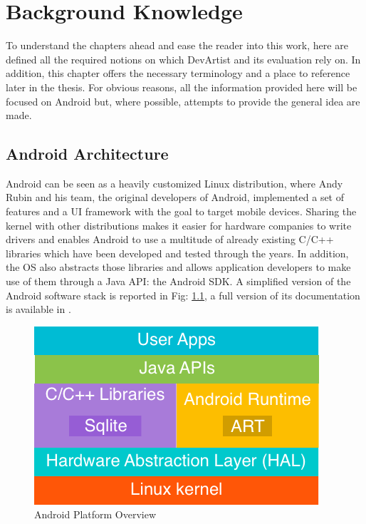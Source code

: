 \chapter{Background Knowledge}
\label{ch:background}
To understand the chapters ahead and ease the reader into this work, here are defined all the required notions on which DevArtist and its evaluation rely on. In addition, this chapter offers the necessary terminology and a place to reference later in the thesis. For obvious reasons, all the information provided here will be focused on Android but, where possible, attempts to provide the general idea are made.

\section{Android Architecture}
Android can be seen as a heavily customized Linux distribution, where Andy Rubin and his team, the original developers of Android, implemented a set of features and a UI framework with the goal to target mobile devices. Sharing the kernel with other distributions makes it easier for hardware companies to write drivers and enables Android to use a multitude of already existing C/C++ libraries which have been developed and tested through the years. In addition, the OS also abstracts those libraries and allows application developers to make use of them through a Java API: the Android SDK. A simplified version of the Android software stack is reported in Fig: \ref{fig:androidstack}, a full version of its documentation is available in \cite{and_doc_stack}.

\begin{figure}
	\centering
	\includegraphics[scale=0.8]{img/android_stack.png}
	\caption{Android Platform Overview\cite{artist}}
	\label{fig:androidstack}
\end{figure}

